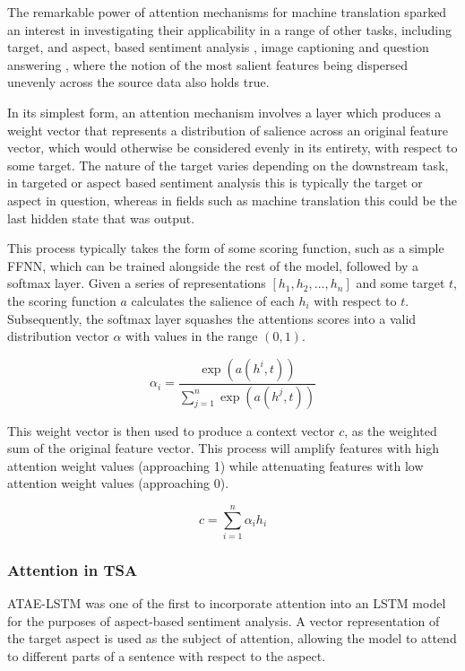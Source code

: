 \documentclass[../../fyp.tex]{subfiles}
\begin{document}
The remarkable power of attention mechanisms for machine translation \cite{bahdanau2014} sparked an interest in investigating their applicability in a range of other tasks, including target, and aspect, based sentiment analysis \cite{wang} \cite{chen2017} \cite{dehongma2017} \cite{zheng2018}, image captioning \cite{kelvinxu2015} and question answering \cite{hermann2015}, where the notion of the most salient features being dispersed unevenly across the source data also holds true.

In its simplest form, an attention mechanism involves a layer which produces a weight vector that represents a distribution of salience across an original feature vector, which would otherwise be considered evenly in its entirety, with respect to some target. The nature of the target varies depending on the downstream task, in targeted or aspect based sentiment analysis this is typically the target or aspect in question, whereas in fields such as machine translation this could be the last hidden state that was output.

This process typically takes the form of some scoring function, such as a simple FFNN, which can be trained alongside the rest of the model, followed by a softmax layer. Given a series of representations $[h_{1}, h_{2}, ..., h_{n}]$ and some target $t$, the scoring function $a$ calculates the salience of each $h_{i}$ with respect to $t$. Subsequently, the softmax layer squashes the attentions scores into a valid distribution vector $\alpha$ with values in the range $(0, 1)$.

\begin{equation} \label{eq:attention_alignment_model}
	\alpha_{i} = \frac{\exp(a(h^{i},t))}{\sum_{j=1}^{n}\exp(a(h^{j},t))}
\end{equation}

This weight vector is then used to produce a context vector $c$, as the weighted sum of the original feature vector. This process will amplify features with high attention weight values (approaching 1) while attenuating features with low attention weight values (approaching 0).

\begin{equation} \label{eq:attention_weighted_sum}
	c = \sum_{i=1}^{n}\alpha_{i}h_{i}
\end{equation}

\subsubsection{Attention in TSA}
ATAE-LSTM \cite{wang} was one of the first to incorporate attention into an LSTM model for the purposes of aspect-based sentiment analysis. A vector representation of the target aspect is used as the subject of attention, allowing the model to attend to different parts of a sentence with respect to the aspect.
\end{document}
